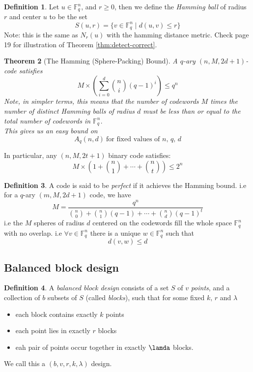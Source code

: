 \documentclass[11pt,a4paper]{article}
\theoremstyle{definition}
\newtheorem{definition}{Definition}[section]
\theoremstyle{plain}
\newtheorem{theorem}[definition]{Theorem}
\theoremstyle{remark}
\begin{document}
\begin{definition}
    Let $u \in \mathbb{F}_q^n$, and $r \geq 0$, then we define the \emph{Hamming ball} of radius $r$ and center $u$ to be the set 
    $$S(u, r) = \{v \in \mathbb{F}_q^n \mid d(u, v) \leq r\}$$
    Note: this is the same as $N_r(u)$ with the hamming distance metric. Check page 19 for illustration of Theorem \ref{thm:detect-correct}. 
\end{definition}

\begin{theorem}[The Hamming (Sphere-Packing) Bound]\label{thm:hamming-bound}
    A $q$-ary $(n, M, 2d + 1)$-code satisfies 
    $$M \times \left(\sum_{i = 0}^{d}\binom{n}{i} (q-1)^i\right) \leq q^n$$
    Note, in simpler terms, this means that the number of codewords $M$ times the number of distinct Hamming balls of radius $d$ must be less than or equal to the total number of codewords in $\mathbb{F}_q^n$. \\
    This gives us an easy bound on 
    $$A_q(n, d) \ \text{for fixed values of $n, \, q, \, d$}$$
\end{theorem}

In particular, any $(n, M, 2t + 1)$ binary code satisfies:  
$$M \times \left(1 + \binom{n}{1} + \cdots + \binom{n}{t}\right) \leq 2^n$$

\begin{definition}
    A code is said to be \emph{perfect} if it achieves the Hamming bound. i.e for a $q$-ary $(m, M, 2d + 1)$ code, we have 
    $$M = \frac{q^n}{\binom{n}{0} + \binom{n}{1} (q - 1)+ \cdots + \binom{n}{d}(q-1)^t}$$
    i.e the $M$ spheres of radius $d$ centered on the codewords fill the whole space $\mathbb{F}_q^n$ with no overlap. i.e $\forall v \in \mathbb{F}_q^n$ there is a unique 
    $w \in \mathbb{F}_q^n$ such that 
    $$d(v, w) \leq d$$
\end{definition}

\subsection{Balanced block design} 

\begin{definition}
    A \emph{balanced block design} consists of a set $S$ of $v$ \emph{points}, and a collection of $b$ subsets of $S$ (called \emph{blocks}), such that for some fixed $k, \, r$ and $\lambda$ 
    \begin{itemize}
        \item each block contains exactly $k$ points
        \item each point lies in exactly $r$ blocks
        \item eah pair of points occur together in exactly $\lamda$ blocks.
    \end{itemize}
    We call this a $(b, v, r, k, \lambda)$ design. 
\end{definition}
\end{document}
